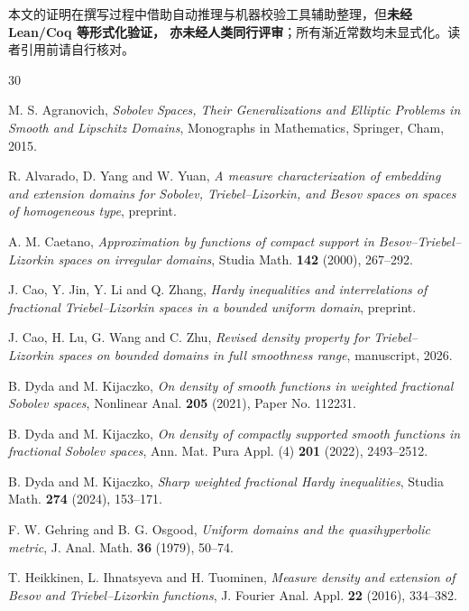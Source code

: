 \noindent{}
本文的证明在撰写过程中借助自动推理与机器校验工具辅助整理，但\textbf{未经 Lean/Coq 等形式化验证，
亦未经人类同行评审}；所有渐近常数均未显式化。读者引用前请自行核对。

\begin{thebibliography}{30}

 M. S. Agranovich, \emph{Sobolev Spaces, Their Generalizations and Elliptic Problems in Smooth and Lipschitz Domains}, Monographs in Mathematics, Springer, Cham, 2015.

 R. Alvarado, D. Yang and W. Yuan, \emph{A measure characterization of embedding and extension domains for Sobolev, Triebel--Lizorkin, and Besov spaces on spaces of homogeneous type}, preprint.

 A. M. Caetano, \emph{Approximation by functions of compact support in Besov--Triebel--Lizorkin spaces on irregular domains}, Studia Math. \textbf{142} (2000), 267--292.

 J. Cao, Y. Jin, Y. Li and Q. Zhang, \emph{Hardy inequalities and interrelations of fractional Triebel--Lizorkin spaces in a bounded uniform domain}, preprint.

 J. Cao, H. Lu, G. Wang and C. Zhu, \emph{Revised density property for Triebel--Lizorkin spaces on bounded domains in full smoothness range}, manuscript, 2026.

 B. Dyda and M. Kijaczko, \emph{On density of smooth functions in weighted fractional Sobolev spaces}, Nonlinear Anal. \textbf{205} (2021), Paper No. 112231.

 B. Dyda and M. Kijaczko, \emph{On density of compactly supported smooth functions in fractional Sobolev spaces}, Ann. Mat. Pura Appl. (4) \textbf{201} (2022), 2493--2512.

 B. Dyda and M. Kijaczko, \emph{Sharp weighted fractional Hardy inequalities}, Studia Math. \textbf{274} (2024), 153--171.

 F. W. Gehring and B. G. Osgood, \emph{Uniform domains and the quasihyperbolic metric}, J. Anal. Math. \textbf{36} (1979), 50--74.

 T. Heikkinen, L. Ihnatsyeva and H. Tuominen, \emph{Measure density and extension of Besov and Triebel--Lizorkin functions}, J. Fourier Anal. Appl. \textbf{22} (2016), 334--382.


\end{thebibliography}
